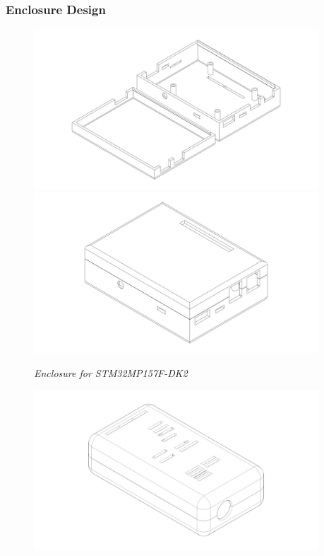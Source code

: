 \documentclass[8pt,compress,aspectratio=169]{beamer}
\begin{document}
\begin{frame}
  \frametitle{Enclosure Design}
  \begin{minipage}{0.475\textwidth}
    \begin{figure}
      \includegraphics[width=0.95\textwidth]{assets/electronic/stm32_enclosure_final_test_pic1.jpg}
      \includegraphics[width=0.95\textwidth]{assets/electronic/stm32_enclosure_final_testpic2.jpg}
      \caption{\it Enclosure for STM32MP157F-DK2}
    \end{figure}
  \end{minipage}
  \hfill
  \begin{minipage}{0.45\textwidth}
    \begin{figure}
      \includegraphics[width=0.95\textwidth]{assets/electronic/psperi_enclosure_final_testpic1.jpg}

\end{figure}
\end{minipage}
\end{frame}
\end{document}
